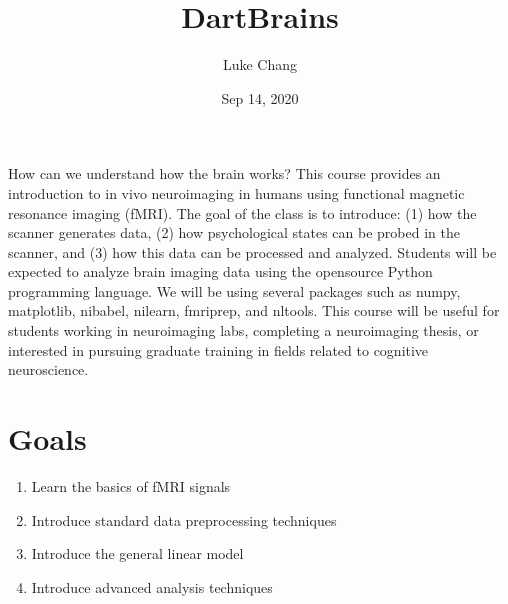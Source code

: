 \documentclass[letterpaper,10pt,english]{sphinxmanual}
\title{DartBrains}
\date{Sep 14, 2020}
\author{Luke Chang}
\begin{document}
\pagestyle{empty}
\sphinxmaketitle
\pagestyle{plain}
\sphinxtableofcontents
\pagestyle{normal}
\label{\detokenize{content/intro::doc}}



How can we understand how the brain works? This course provides an introduction to in vivo neuroimaging in humans using functional magnetic resonance imaging (fMRI). The goal of the class is to introduce: (1) how the scanner generates data, (2) how psychological states can be probed in the scanner, and (3) how this data can be processed and analyzed. Students will be expected to analyze brain imaging data using the opensource Python programming language. We will be using several packages such as numpy, matplotlib, nibabel, nilearn, fmriprep, and nltools. This course will be useful for students working in neuroimaging labs, completing a neuroimaging thesis, or interested in pursuing graduate training in fields related to cognitive neuroscience.


\chapter{Goals}
\label{\detokenize{content/intro:goals}}\begin{enumerate}
%
\item {} 
Learn the basics of fMRI signals

\item {} 
Introduce standard data preprocessing techniques

\item {} 
Introduce the general linear model

\item {} 
Introduce advanced analysis techniques

\end{enumerate}
\end{document}

